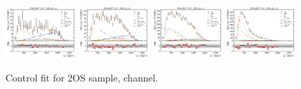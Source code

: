 \begin{figure}[!htb]
    \includegraphics[width=0.24\textwidth]{./figs-fit-fit-results/ctrl-fit/lines_q2_slices/fit_result-lines_q2_idx1-Dst-2os-el.pdf}
    \includegraphics[width=0.24\textwidth]{./figs-fit-fit-results/ctrl-fit/lines_q2_slices/fit_result-lines_q2_idx2-Dst-2os-el.pdf}
    \includegraphics[width=0.24\textwidth]{./figs-fit-fit-results/ctrl-fit/lines_q2_slices/fit_result-lines_q2_idx3-Dst-2os-el.pdf}
    \includegraphics[width=0.24\textwidth]{./figs-fit-fit-results/ctrl-fit/lines_q2_slices/fit_result-lines_q2_idx4-Dst-2os-el.pdf}

    \caption{Control fit for 2OS sample, \Dstar channel.}
    \label{fig:ctrl-2os-dst}
\end{figure}

